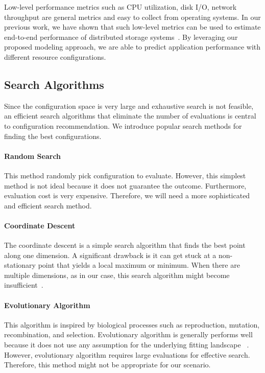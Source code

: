 Low-level performance metrics such as
CPU utilization, disk I/O, network throughput
are general metrics and easy to collect from operating systems.
In our previous work, we have shown that such low-level metrics
can be used to estimate end-to-end performance of
distributed storage systems~\cite{Hsu2016}.
By leveraging our proposed modeling approach, we are able to predict
application performance with different resource configurations.



\subsection{Search Algorithms}

Since the configuration space is very large and
exhaustive search is not feasible,
an efficient search algorithms that eliminate the number of evaluations
is central to configuration recommendation.
We introduce popular search methods for finding the best configurations.

\paragraph*{Random Search}
This method randomly pick configuration to evaluate.
However, this simplest method is not ideal because
it does not guarantee the outcome.
Furthermore, evaluation cost is very expensive.
Therefore, we will need a more sophisticated and efficient search method.

\paragraph*{Coordinate Descent}
The coordinate descent is a simple search algorithm that
finds the best point along one dimension.
A significant drawback is it can get stuck at a non-stationary point
that yields a local maximum or minimum.
When there are multiple dimensions, as in our case, this search algorithm
might become insufficient~\cite{Alipourfard2017}.


\paragraph*{Evolutionary Algorithm}
This algorithm is inspired by biological processes such as
reproduction, mutation, recombination, and selection.
Evolutionary algorithm is generally performs well because
it does not use any assumption for the underlying fitting landscape
~\cite{Bergstra2011}.
However, evolutionary algorithm requires large evaluations for effective search.
Therefore, this method might not be appropriate for our scenario.


